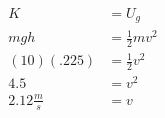 \documentclass[12pt]{article}
\begin{document}










\begin{align} %
K &= U_g \\
mgh &=\frac{1}{2}mv^2 \\
(10)(.225) &=\frac{1}{2}v^2 \nonumber \\  %
4.5 &=v^2 \nonumber \\
2.12 \frac{m}{s} &=v 
\end{align}




\end{document}
